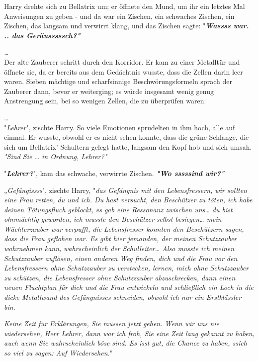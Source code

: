 {Harry drehte sich zu Bellatrix um; er öffnete den Mund, um ihr ein letztes Mal Anweisungen zu geben - und da war ein Zischen, ein schwaches Zischen, ein Zischen, das langsam und verwirrt klang, und das Zischen sagte: "\textbf{\emph{Wassss war.\\ .. das Geräusssssch?"}}

\emph{…}\\ Der alte Zauberer schritt durch den Korridor. Er kam zu einer Metalltür und öffnete sie, da er bereits aus dem Gedächtnis wusste, dass die Zellen darin leer waren. Sieben mächtige und scharfsinnige Beschwörungsformeln sprach der Zauberer dann, bevor er weiterging; es würde insgesamt wenig genug Anstrengung sein, bei so wenigen Zellen, die zu überprüfen waren.

…\\ "\emph{Lehrer}", zischte Harry. So viele Emotionen sprudelten in ihm hoch, alle auf einmal. Er wusste, obwohl er es nicht sehen konnte, dass die grüne Schlange, die sich um Bellatrix' Schultern gelegt hatte, langsam den Kopf hob und sich umsah.\\ \emph{"Sind Sie … in Ordnung, Lehrer?"}

"\textbf{\emph{Lehrer?}}", kam das schwache, verwirrte Zischen. \textbf{\emph{"Wo sssssind wir?"}}

„\emph{Gefängissss}", zischte Harry, "\emph{das Gefängnis mit den Lebensfressern, wir sollten eine Frau retten, du und ich. Du hast versucht, den Beschützer zu töten, ich habe deinen Tötungsfluch geblockt, es gab eine Ressonanz zwischen uns… du bist ohnmächtig geworden, ich musste den Beschützer selbst besiegen… mein Wächterzauber war verpufft, die Lebensfresser konnten den Beschützern sagen, dass die Frau geflohen war.} \emph{Es gibt hier jemanden, der meinen Schutzzauber wahrnehmen kann,} \emph{wahrscheinlich der Schulleiter… Also musste ich meinen Schutzzauber auflösen, einen anderen Weg finden, dich und die Frau vor den Lebensfressern ohne Schutzzauber zu verstecken, lernen, mich ohne Schutzzauber zu schützen, die Lebensfresser ohne Schutzzauber abzuschrecken, dann einen neuen Fluchtplan für dich und die Frau entwickeln und schließlich ein Loch in die dicke Metallwand des Gefängnisses schneiden, obwohl ich nur ein Erstklässler bin.}

\emph{Keine Zeit für Erklärungen, Sie müssen jetzt gehen. Wenn wir uns nie wiedersehen, Herr Lehrer, dann war ich froh, Sie eine Zeit lang gekannt zu haben, auch wenn Sie wahrscheinlich böse sind. Es isst gut, die Chance zu haben, ssich so viel zu sagen: Auf Wiedersehen.}"

}
